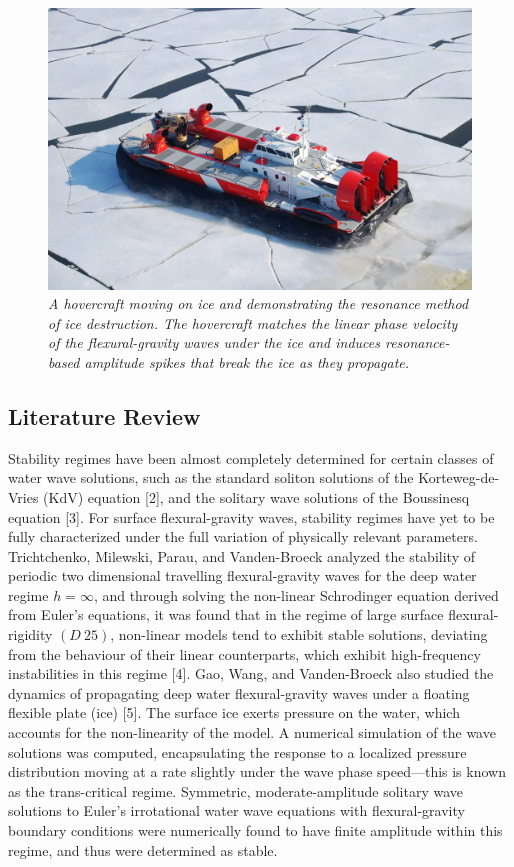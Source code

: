 \documentclass{article}
\begin{document}
\begin{figure}[hbt!]
\centering
\includegraphics[scale = .4]{Hovercraft.jpg}
\caption{ \emph{A hovercraft moving on ice and demonstrating the resonance method of ice destruction. The hovercraft matches the linear phase velocity of the flexural-gravity waves under the ice and induces resonance-based amplitude spikes that break the ice as they propagate.}} \label{Hovercraft}
\end{figure}



\subsection{Literature Review}

Stability regimes have been almost completely determined for certain classes of water wave solutions, such as the standard soliton solutions of the Korteweg-de-Vries (KdV) equation [2], and the solitary wave solutions of the Boussinesq equation [3]. For surface flexural-gravity waves, stability regimes have yet to be fully characterized under the full variation of physically relevant parameters. Trichtchenko, Milewski, Parau, and Vanden-Broeck analyzed the stability of periodic two dimensional travelling flexural-gravity waves for the deep water regime \(h = \infty\), and through solving the non-linear Schrodinger equation derived from Euler’s equations, it was found that in the regime of large surface flexural-rigidity \((D~25)\), non-linear models tend to exhibit stable solutions, deviating from the behaviour of their linear counterparts, which exhibit high-frequency instabilities in this regime [4]. Gao, Wang, and Vanden-Broeck also studied the dynamics of propagating deep water flexural-gravity waves under a floating flexible plate (ice) [5]. The surface ice exerts pressure on the water, which accounts for the non-linearity of the model. A numerical simulation of the wave solutions was computed, encapsulating the response to a localized pressure distribution moving at a rate slightly under the wave phase speed—this is known as the trans-critical regime. Symmetric, moderate-amplitude solitary wave solutions to Euler’s irrotational water wave equations with flexural-gravity boundary conditions were numerically found to have finite amplitude within this regime, and thus were determined as stable. 
\\
\end{document}
